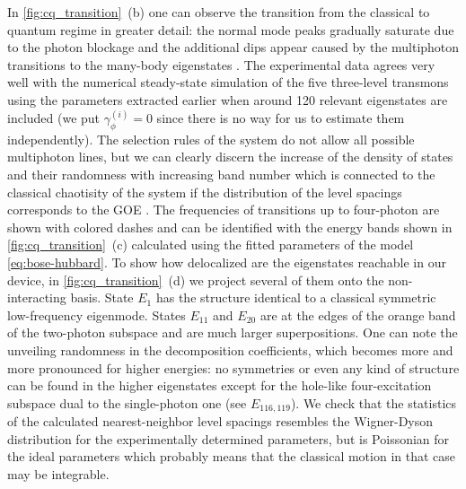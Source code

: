 \documentclass[%
 aps, pra,
 amsmath,amssymb,
 reprint,%
superscriptaddress
]{revtex4-2}
\begin{document}
In \autoref{fig:cq_transition}~(b) one can observe the transition from the classical to quantum regime in greater detail: the normal mode peaks gradually saturate due to the photon blockage and the additional dips appear caused by the multiphoton transitions to the many-body eigenstates \cite{Biella2015,PhysRevA.102.013707}. The experimental data agrees very well with the numerical steady-state simulation of the five three-level transmons using the parameters extracted earlier when around 120 relevant eigenstates are included (we put $\gamma_\phi^{(i)} = 0$ since there is no way for us to estimate them independently). The selection rules of the system do not allow all possible multiphoton lines, but we can clearly discern the increase of the density of states and their randomness with increasing band number which is connected to the classical chaotisity of the system if the distribution of the level spacings corresponds to the GOE \cite{bohigas1984characterization,zimmermann1986manifestation, livan2018introduction}. The frequencies of transitions up to four-photon are shown with colored dashes and can be identified with the energy bands shown in \autoref{fig:cq_transition}~(c) calculated using the fitted parameters of the model \eqref{eq:bose-hubbard}. To show how delocalized are the eigenstates reachable in our device, in \autoref{fig:cq_transition}~(d) we project several of them onto the non-interacting basis. State $E_1$ has the structure identical to a classical symmetric low-frequency eigenmode. States $E_{11}$ and $E_{20}$ are at the edges of the orange band of the two-photon subspace and are much larger superpositions. One can note the unveiling randomness in the decomposition coefficients, which becomes more and more pronounced for higher energies: no symmetries or even any kind of structure can be found in the higher eigenstates except for the hole-like four-excitation subspace dual to the single-photon one (see $E_{116, 119}$). We check that the statistics of the calculated nearest-neighbor level spacings resembles the Wigner-Dyson distribution for the experimentally determined parameters, but is Poissonian for the ideal parameters which probably means that the classical motion in that case may be integrable.
\end{document}
